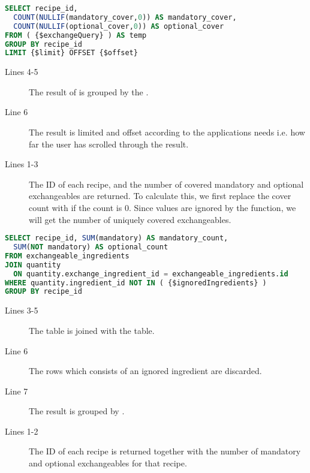 \begin{lstlisting}[language=SQL, morekeywords={NULLIF,OFFSET}, float=h, label={}, caption={\$coverQuery, get the exchangeable cover counts.}]
SELECT recipe_id,
  COUNT(NULLIF(mandatory_cover,0)) AS mandatory_cover,
  COUNT(NULLIF(optional_cover,0)) AS optional_cover
FROM ( {$exchangeQuery} ) AS temp
GROUP BY recipe_id
LIMIT {$limit} OFFSET {$offset}
\end{lstlisting}

\begin{description}
\item[Lines 4-5] The result of  is grouped by the .
\item[Line 6] The result is limited and offset according to the applications needs i.e. how far the user has scrolled through the result.
\item[Lines 1-3] The ID of each recipe, and the number of covered mandatory and optional exchangeables are returned. To calculate this, we first replace the cover count with  if the count is 0. Since  values are ignored by the  function, we will get the number of uniquely covered exchangeables.
\end{description}



\begin{lstlisting}[language=SQL, float=h, label={}, caption={\$countQuery, count the number of mandatory and optional exchangeables.}]
SELECT recipe_id, SUM(mandatory) AS mandatory_count,
  SUM(NOT mandatory) AS optional_count
FROM exchangeable_ingredients
JOIN quantity
  ON quantity.exchange_ingredient_id = exchangeable_ingredients.id
WHERE quantity.ingredient_id NOT IN ( {$ignoredIngredients} )
GROUP BY recipe_id
\end{lstlisting}

\begin{description}
\item[Lines 3-5] The  table is joined with the  table.
\item[Line 6] The rows which consists of an ignored ingredient are discarded.
\item[Line 7] The result is grouped by .
\item[Lines 1-2] The ID of each recipe is returned together with the number of mandatory and optional exchangeables for that recipe.
\end{description}



